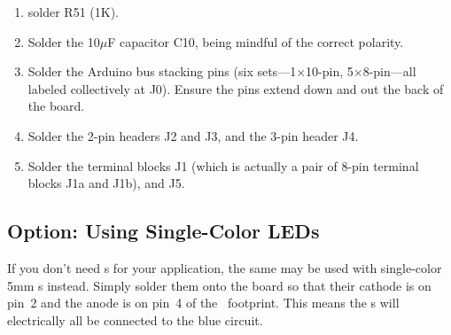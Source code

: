 \begin{enumerate}
		\begin{itemize}
			\item D512 (bottom): green (with R24=300$\Omega$)\footnote{Resistor values based on typical \led\ voltage and current ratings. Check to see what is appropriate for your components.}
			\item D513: amber\footnote{In deference to the effort my high school drama teacher went through to get us to refer to any yellow stage lights and gels as ``amber'' and the
				preference to using ``amber'' for signal lamp colors in other contexts and regions, both terms will be used interchangeably in this project.} (with R25=360$\Omega$)
			\item D514: amber (with R26=360$\Omega$)
			\item D515: red (with R27=360$\Omega$)
			\item D516: red (with R28=360$\Omega$)
			\item D517: blue (with R29=300$\Omega$)
			\item D518: blue (with R30=300$\Omega$)
			\item D519 (top): white (with R31=300$\Omega$)
		\end{itemize}
	\item {} solder R51 (1K).
	\item {} Solder the 10$\mu$F capacitor C10, being mindful of the correct polarity. 
	\item Solder the Arduino bus stacking pins (six sets---1$\times$10-pin, 5$\times$8-pin---all labeled collectively at J0).
		Ensure the pins extend down and out the back of the board.
	\item Solder the 2-pin headers J2 and J3, and the 3-pin header J4.
	\item Solder the terminal blocks J1 (which is actually a pair of 8-pin terminal blocks J1a and J1b), and J5.
\end{enumerate}


\subsection{Option: Using Single-Color LEDs}
If you don't need  \led s for your application, the same 
may be used with single-color 5mm \led s instead. Simply solder them onto the board so
that their cathode is on pin~2 and the anode is on pin~4 of the \led\ footprint. This
means the \led s will electrically all be connected to the blue circuit. 

